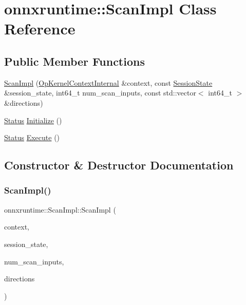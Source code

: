 \hypertarget{classonnxruntime_1_1ScanImpl}{}\section{onnxruntime\+:\+:Scan\+Impl Class Reference}
\label{classonnxruntime_1_1ScanImpl}
\subsection*{Public Member Functions}
\begin{DoxyCompactItemize}
\item 
\mbox{\hyperlink{classonnxruntime_1_1ScanImpl_a3293d5e94757e566dee4906ea1675b3f}{Scan\+Impl}} (\mbox{\hyperlink{classonnxruntime_1_1OpKernelContextInternal}{Op\+Kernel\+Context\+Internal}} \&context, const \mbox{\hyperlink{classonnxruntime_1_1SessionState}{Session\+State}} \&session\+\_\+state, int64\+\_\+t num\+\_\+scan\+\_\+inputs, const std\+::vector$<$ int64\+\_\+t $>$ \&directions)
\item 
\mbox{\hyperlink{classonnxruntime_1_1common_1_1Status}{Status}} \mbox{\hyperlink{classonnxruntime_1_1ScanImpl_a04f68d9cf61a52cb26e380ddc9fcdb7f}{Initialize}} ()
\item 
\mbox{\hyperlink{classonnxruntime_1_1common_1_1Status}{Status}} \mbox{\hyperlink{classonnxruntime_1_1ScanImpl_a3e0418181e208aa98999582ff93c3d62}{Execute}} ()
\end{DoxyCompactItemize}


\subsection{Constructor \& Destructor Documentation}
\mbox{\label{classonnxruntime_1_1ScanImpl_a3293d5e94757e566dee4906ea1675b3f}} 
\subsubsection{\texorpdfstring{Scan\+Impl()}{ScanImpl()}}
{\footnotesize\ttfamily onnxruntime\+::\+Scan\+Impl\+::\+Scan\+Impl (\begin{DoxyParamCaption}\item[{\mbox{\hyperlink{classonnxruntime_1_1OpKernelContextInternal}{Op\+Kernel\+Context\+Internal}} \&}]{context,  }\item[{const \mbox{\hyperlink{classonnxruntime_1_1SessionState}{Session\+State}} \&}]{session\+\_\+state,  }\item[{int64\+\_\+t}]{num\+\_\+scan\+\_\+inputs,  }\item[{const std\+::vector$<$ int64\+\_\+t $>$ \&}]{directions }\end{DoxyParamCaption})}



